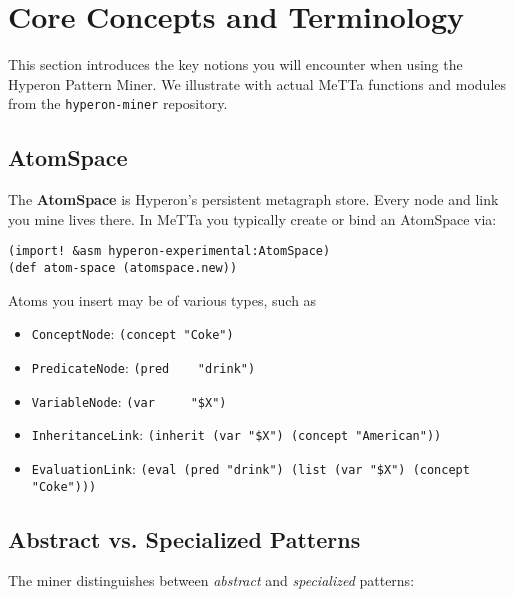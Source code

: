 \section{Core Concepts and Terminology}

This section introduces the key notions you will encounter when using the Hyperon Pattern Miner.  We illustrate with actual MeTTa functions and modules from the \texttt{hyperon-miner} repository.

\subsection{AtomSpace}

The \textbf{AtomSpace} is Hyperon's persistent metagraph store.  Every node and link you mine lives there.  In MeTTa you typically create or bind an AtomSpace via:

\begin{verbatim}
(import! &asm hyperon-experimental:AtomSpace)
(def atom-space (atomspace.new))
\end{verbatim}

Atoms you insert may be of various types, such as

\begin{itemize}
  \item \texttt{ConceptNode}: \verb|(concept "Coke")|
  \item \texttt{PredicateNode}: \verb|(pred    "drink")|
  \item \texttt{VariableNode}:  \verb|(var     "$X")|
  \item \texttt{InheritanceLink}: 
    \verb|(inherit (var "$X") (concept "American"))|
  \item \texttt{EvaluationLink}:  
    \verb|(eval (pred "drink") (list (var "$X") (concept "Coke")))|
\end{itemize}

\subsection{Abstract vs. Specialized Patterns}

The miner distinguishes between \emph{abstract} and \emph{specialized} patterns:

